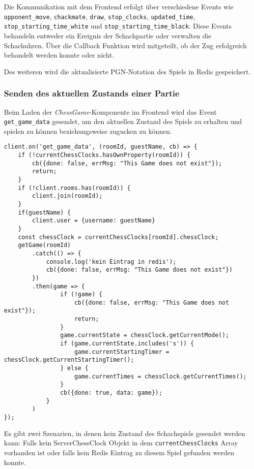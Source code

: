 Die Kommunikation mit dem Frontend erfolgt über verschiedene Events wie \verb|opponent_move|, \verb|chackmate|, \verb|draw|, \verb|stop_clocks|, \verb|updated_time|, \verb|stop_starting_time_white| und \verb|stop_starting_time_black|. Diese Events behandeln entweder ein Ereignis der Schachpartie oder verwalten die Schachuhren. Über die Callback Funktion wird mitgeteilt, ob der Zug erfolgreich behandelt werden konnte oder nicht.

Des weiteren wird die aktualisierte PGN-Notation des Spiels in Redis gespeichert.

\subsubsection{Senden des aktuellen Zustands einer Partie}
Beim Laden der \textit{ChessGame}-Komponente im Frontend wird das Event \verb|get_game_data| gesendet, um den aktuellen Zustand des Spiels zu erhalten und spielen zu können beziehungsweise zugucken zu können. 


\begin{lstlisting}[style=codeStyle, caption={Der Listener des get\_game\_data Events zum übermitteln des Schachspiels}, label={lst:get_game_data}]
client.on('get_game_data', (roomId, guestName, cb) => {
    if (!currentChessClocks.hasOwnProperty(roomId)) {
        cb({done: false, errMsg: "This Game does not exist"});
        return;
    }
    if (!client.rooms.has(roomId)) {
        client.join(roomId);
    }
    if(guestName) {
        client.user = {username: guestName}
    }
    const chessClock = currentChessClocks[roomId].chessClock;
    getGame(roomId)
        .catch(() => {
            console.log('kein Eintrag in redis');
            cb({done: false, errMsg: "This Game does not exist"})
        })
        .then(game => {
                if (!game) {
                    cb({done: false, errMsg: "This Game does not exist"});
                    return;
                }
                game.currentState = chessClock.getCurrentMode();
                if (game.currentState.includes('s')) {
                    game.currentStartingTimer = chessClock.getCurrentStartingTimer();
                } else {
                    game.currentTimes = chessClock.getCurrentTimes();
                }
                cb({done: true, data: game});
            }
        )
});
\end{lstlisting}

Es gibt zwei Szenarien, in denen kein Zustand des Schachspiels gesendet werden kann: Falls kein ServerChessClock Objekt in dem \verb|currentChessClocks| Array vorhanden ist oder falls kein Redis Eintrag zu diesem Spiel gefunden werden konnte.

